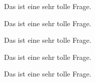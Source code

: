 \documentclass[paper=a4]{scrartcl}
\begin{document}
\begin{exercise}[subtitle=Eine Frage, AFB=1, points=3]
  Das ist eine sehr tolle Frage.
\end{exercise}

\begin{exercise}[AFB=2, points=3]
  Das ist eine sehr tolle Frage.
\end{exercise}

\begin{exercise}[AFB=3]
  Das ist eine sehr tolle Frage.
\end{exercise}

\begin{exercise}[subtitle=Eine andere Frage, AFB=4, points=3]
  Das ist eine sehr tolle Frage.
\end{exercise}

\begin{exercise}[subtitle=Eine Frage, AFB=2]
  Das ist eine sehr tolle Frage.
\end{exercise}
\end{document}
